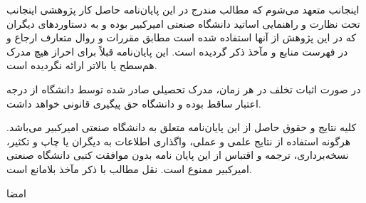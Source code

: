 \vspace*{2.5cm}

اينجانب {\bf{\fname\lname}} متعهد می‌شوم که مطالب مندرج در این پایان‌نامه حاصل کار پژوهشی اینجانب تحت نظارت و راهنمایی اساتید دانشگاه صنعتی امیرکبیر بوده و به دستاوردهای دیگران که در این پژوهش از آنها استفاده شده است مطابق مقررات و روال متعارف ارجاع و در فهرست منابع و مآخذ ذکر گردیده است. این پایان‌نامه قبلاً برای احراز هیچ مدرک هم‌سطح یا بالاتر ارائه نگردیده است.

در صورت اثبات تخلف در هر زمان، مدرک تحصیلی صادر شده توسط دانشگاه از درجه اعتبار ساقط بوده و دانشگاه حق پیگیری قانونی خواهد داشت.


کلیه نتایج و حقوق حاصل از این پایان‌نامه متعلق به دانشگاه صنعتی امیرکبیر می‌باشد. هرگونه استفاده از نتایج علمی و عملی، واگذاری اطلاعات به دیگران یا چاپ و تکثیر، نسخه‌برداری، ترجمه و اقتباس از این پایان نامه بدون موافقت کتبی دانشگاه صنعتی امیرکبیر ممنوع است. 
نقل مطالب با ذکر مآخذ بلامانع است.\\
\vspace{2.5cm}


{\centerline {\bf{\fname\lname}}}
\vspace*{.2cm}
{\centerline{امضا}}

